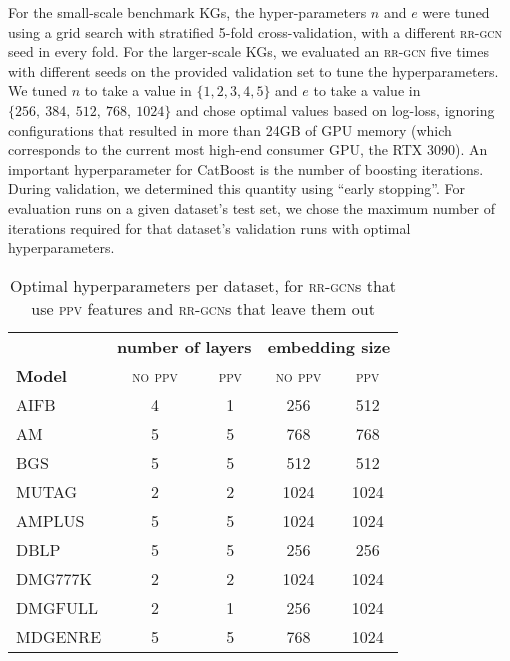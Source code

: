 \documentclass{llncs}
\begin{document}
For the small-scale benchmark KGs, the hyper-parameters $n$ and $e$ were tuned using a grid search with stratified 5-fold cross-validation, with a different \textsc{rr-gcn} seed in every fold. For the larger-scale KGs, we evaluated an \textsc{rr-gcn} five times with different seeds on the provided validation set to tune the hyperparameters. We tuned $n$ to take a value in $\{1, 2, 3, 4, 5\}$ and $e$ to take a value in $\{256, ~384, ~512, ~768, ~1024 \}$ and chose optimal values based on log-loss, ignoring configurations that resulted in more than 24GB of GPU memory (which corresponds to the current most high-end consumer GPU, the RTX 3090). 
An important hyperparameter for CatBoost is the number of boosting iterations. During validation, we determined this quantity using ``early stopping''. For evaluation runs on a given dataset's test set, we chose the maximum number of iterations required for that dataset's validation runs with optimal hyperparameters. 

\begin{table}[t]
\begin{center}
 
\begin{tabular}{lcccc}
\toprule
{} & \multicolumn{2}{c}{\textbf{number of layers}} & \multicolumn{2}{c}{\textbf{embedding size}} \\\cmidrule(lr){4-5} \cmidrule(lr){2-3}
 \textbf{Model} &      \textsc{no ppv} &  \textsc{ppv}  &         \textsc{no ppv} &     \textsc{ppv} \\
\midrule
AIFB    &      4 &  1 &       256 &   512 \\
AM      &      5 &  5 &       768 &   768 \\
BGS     &      5 &  5 &       512 &   512 \\
MUTAG   &      2 &  2 &      1024 &  1024 \\\midrule
AMPLUS  &      5 &  5 &      1024 &  1024 \\
DBLP    &      5 &  5 &       256 &   256 \\
DMG777K &      2 &  2 &      1024 &  1024 \\
DMGFULL &      2 &  1 &       256 &  1024 \\
MDGENRE &      5 &  5 &       768 &  1024 \\
\bottomrule
\end{tabular}
\end{center}
\caption{Optimal hyperparameters per dataset, for \textsc{rr-gcn}s that use \textsc{ppv} features and \textsc{rr-gcn}s that leave them out \label{table:hyperparams}}
\end{table}
\end{document}
